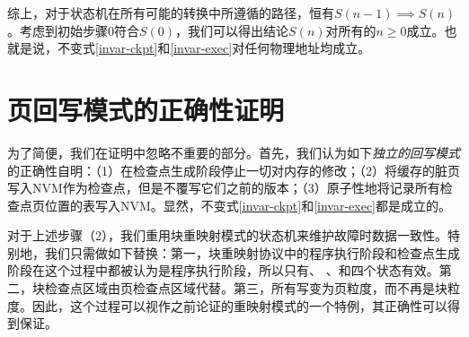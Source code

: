 综上，对于状态机在所有可能的转换中所遵循的路径，恒有$S(n-1)
\implies S(n)$。考虑到初始步骤0符合$S(0)$，我们可以得出结论$S(n)$对所有的$n \ge 0$成立。也就是说，不变式\ref{invar-ckpt}和\ref{invar-exec}对任何物理地址均成立。


%

\section{页回写模式的正确性证明}
\label{sec:proof-page-writeback}

为了简便，我们在证明中忽略不重要的部分。首先，我们认为如下\emph{独立的回写模式}的正确性自明：（1）在检查点生成阶段停止一切对内存的修改；（2）将缓存的脏页写入NVM作为检查点，但是不覆写它们之前的版本；（3）原子性地将记录所有检查点页位置的表写入NVM。显然，不变式\ref{invar-ckpt}和\ref{invar-exec}都是成立的。 

对于上述步骤（2），我们重用块重映射模式的状态机来维护故障时数据一致性。特别地，我们只需做如下替换：第一，块重映射协议中的程序执行阶段和检查点生成阶段在这个过程中都被认为是程序执行阶段，所以只有、
、和四个状态有效。第二，块检查点区域由页检查点区域代替。第三，所有写变为页粒度，而不再是块粒度。因此，这个过程可以视作之前论证的重映射模式的一个特例，其正确性可以得到保证。

